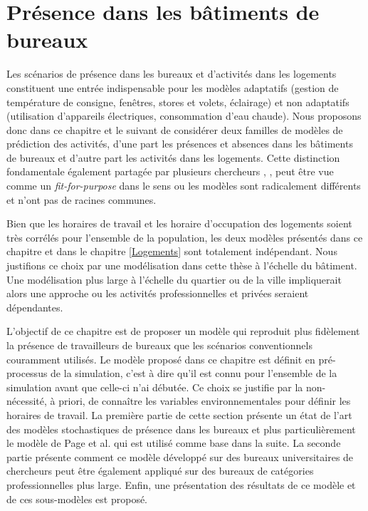 \section{Présence dans les bâtiments de bureaux}

Les scénarios de présence dans les bureaux et d'activités dans les logements constituent une entrée indispensable pour les modèles adaptatifs (gestion de température de consigne, fenêtres, stores et volets, éclairage) et non adaptatifs (utilisation d'appareils électriques, consommation d'eau chaude). Nous proposons donc dans ce chapitre et le suivant de considérer deux familles de modèles de prédiction des activités, d'une part les présences et absences dans les bâtiments de bureaux et d'autre part les activités dans les logements. Cette distinction fondamentale également partagée par plusieurs chercheurs \cite{Vorger-14}, \cite{Page-08}, \cite{Chapman-14} peut être vue comme un \textit{fit-for-purpose} dans le sens ou les modèles sont radicalement différents et n'ont pas de racines communes.

Bien que les horaires de travail et les horaire d'occupation des logements soient très corrélés pour l'ensemble de la population, les deux modèles présentés dans ce chapitre et dans le chapitre \ref{Logements} sont totalement indépendant. Nous justifions ce choix par une modélisation dans cette thèse à l'échelle du bâtiment. Une modélisation plus large à l'échelle du quartier ou de la ville impliquerait alors une approche ou les activités professionnelles et privées seraient dépendantes.

L'objectif de ce chapitre est de proposer un modèle qui reproduit plus fidèlement la présence de travailleurs de bureaux que les scénarios conventionnels couramment utilisés. Le modèle proposé dans ce chapitre est définit en pré-processus de la simulation, c'est à dire qu'il est connu pour l'ensemble de la simulation avant que celle-ci n'ai débutée. Ce choix se justifie par la non-nécessité, à priori, de connaître les variables environnementales pour définir les horaires de travail. La première partie de cette section présente un état de l'art des modèles stochastiques de présence dans les bureaux et plus particulièrement le modèle de Page et al. \cite{Page-08} qui est utilisé comme base dans la suite. La seconde partie présente comment ce modèle développé sur des bureaux universitaires de chercheurs peut être également appliqué sur des bureaux de catégories professionnelles plus large. Enfin, une présentation des résultats de ce modèle et de ces sous-modèles est proposé.

